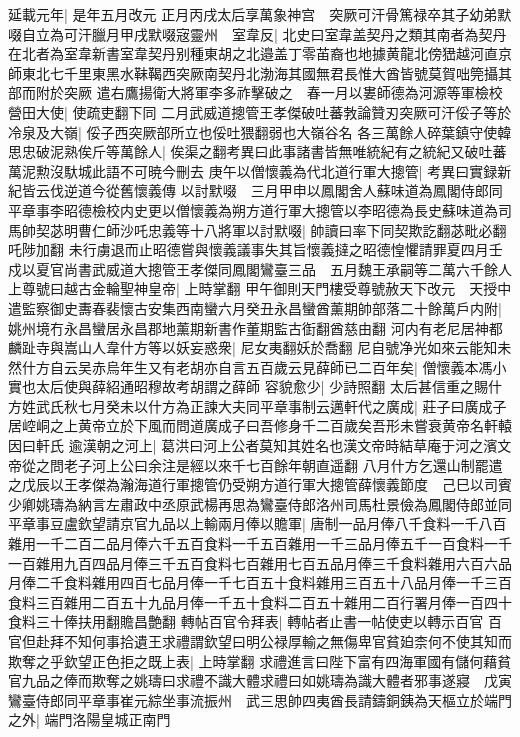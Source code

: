 延載元年|{
	是年五月改元}
正月丙戌太后享萬象神宫　突厥可汗骨篤禄卒其子幼弟默啜自立為可汗臘月甲戌默啜宼靈州　室韋反|{
	北史曰室韋盖契丹之類其南者為契丹在北者為室韋新書室韋契丹别種東胡之北邉盖丁零苖裔也地據黄龍北傍峱越河直京師東北七千里東黑水靺鞨西突厥南契丹北渤海其國無君長惟大酋皆號莫賀咄筦攝其部而附於突厥}
遣右鷹揚衛大將軍李多祚擊破之　春一月以婁師德為河源等軍檢校營田大使|{
	使疏吏翻下同}
二月武威道摠管王孝傑破吐蕃㪍論贊刃突厥可汗俀子等於冷泉及大嶺|{
	俀子西突厥部所立也俀吐猥翻弱也大嶺谷名}
各三萬餘人碎葉鎮守使韓思忠破泥熟俟斤等萬餘人|{
	俟渠之翻考異曰此事諸書皆無唯統紀有之統紀又破吐蕃萬泥勲沒馱城此語不可暁今刪去}
庚午以僧懷義為代北道行軍大摠管|{
	考異曰實録新紀皆云伐逆道今從舊懷義傳}
以討默啜　三月甲申以鳳閣舍人蘇味道為鳳閣侍郎同平章事李昭德檢校内史更以僧懷義為朔方道行軍大摠管以李昭德為長史蘇味道為司馬帥契苾明曹仁師沙吒忠義等十八將軍以討默啜|{
	帥讀曰率下同契欺訖翻苾毗必翻吒陟加翻}
未行虜退而止昭德嘗與懷義議事失其旨懷義撻之昭德惶懼請罪夏四月壬戍以夏官尚書武威道大摠管王孝傑同鳳閣鸞臺三品　五月魏王承嗣等二萬六千餘人上尊號曰越古金輪聖神皇帝|{
	上時掌翻}
甲午御則天門樓受尊號赦天下改元　天授中遣監察御史夀春裴懷古安集西南蠻六月癸丑永昌蠻酋薰期帥部落二十餘萬戶内附|{
	姚州境冇永昌蠻居永昌郡地薰期新書作董期監古衘翻酋慈由翻}
河内有老尼居神都麟趾寺與嵩山人韋什方等以妖妄惑衆|{
	尼女夷翻妖於喬翻}
尼自號净光如來云能知未然什方自云吴赤烏年生又有老胡亦自言五百歲云見薛師已二百年矣|{
	僧懷義本馮小實也太后使與薛紹通昭穆故考胡謂之薛師}
容貌愈少|{
	少詩照翻}
太后甚信重之賜什方姓武氏秋七月癸未以什方為正諫大夫同平章事制云邁軒代之廣成|{
	莊子曰廣成子居崆峒之上黄帝立於下風而問道廣成子曰吾修身千二百歲矣吾形未嘗衰黄帝名軒轅因曰軒氏}
逾漢朝之河上|{
	葛洪曰河上公者莫知其姓名也漢文帝時結草庵于河之濱文帝從之問老子河上公曰余注是經以來千七百餘年朝直遥翻}
八月什方乞還山制罷遣之戊辰以王孝傑為瀚海道行軍摠管仍受朔方道行軍大摠管薛懷義節度　己巳以司賓少卿姚璹為納言左肅政中丞原武楊再思為鸞臺侍郎洛州司馬杜景儉為鳳閣侍郎並同平章事豆盧欽望請京官九品以上輸兩月俸以贍軍|{
	唐制一品月俸八千食料一千八百雜用一千二百二品月俸六千五百食料一千五百雜用一千三品月俸五千一百食料一千一百雜用九百四品月俸三千五百食料七百雜用七百五品月俸三千食料雜用六百六品月俸二千食料雜用四百七品月俸一千七百五十食料雜用三百五十八品月俸一千三百食料三百雜用二百五十九品月俸一千五十食料二百五十雜用二百行署月俸一百四十食料三十俸扶用翻贍昌艶翻}
轉帖百官令拜表|{
	轉帖者止書一帖使吏以轉示百官}
百官但赴拜不知何事拾遺王求禮謂欽望曰明公禄厚輸之無傷卑官貧廹柰何不使其知而欺奪之乎欽望正色拒之既上表|{
	上時掌翻}
求禮進言曰陛下富有四海軍國有儲何藉貧官九品之俸而欺奪之姚璹曰求禮不識大體求禮曰如姚璹為識大體者邪事遂寢　戊寅鸞臺侍郎同平章事崔元綜坐事流振州　武三思帥四夷酋長請鑄銅銕為天樞立於端門之外|{
	端門洛陽皇城正南門}
